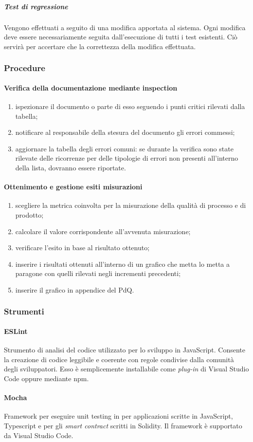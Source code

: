 \subparagraph*{Test di regressione}
Vengono effettuati a seguito di una modifica apportata al sistema. Ogni modifica deve essere necessariamente seguita dall'esecuzione di tutti i test esistenti. Ciò servirà per accertare che la correttezza della modifica effettuata.


\subsubsection{Procedure}
\paragraph{Verifica della documentazione mediante inspection}
\begin{enumerate}
	\item ispezionare il documento o parte di esso seguendo i punti critici rilevati dalla tabella;
	\item notificare al responsabile della stesura del documento gli errori commessi;
	\item aggiornare la tabella degli errori comuni: se durante la verifica sono state rilevate delle ricorrenze per delle tipologie di errori non presenti all'interno della lista, dovranno essere riportate.
\end{enumerate}
\paragraph{Ottenimento e gestione esiti misurazioni}
\begin{enumerate}
	\item scegliere la metrica coinvolta per la misurazione della qualità di processo e di prodotto;
	\item calcolare il valore corrispondente all'avvenuta misurazione;
	\item verificare l'esito in base al risultato ottenuto;
	\item inserire i risultati ottenuti all'interno di un grafico che metta lo metta a paragone con quelli rilevati negli incrementi precedenti;
	\item inserire il grafico in appendice del PdQ.
\end{enumerate}

\subsubsection{Strumenti}
\paragraph{ESLint}
Strumento di analisi del codice utilizzato per lo sviluppo in JavaScript. Consente la creazione di codice leggibile e coerente con regole condivise dalla comunità degli sviluppatori. Esso è semplicemente installabile come \textit{plug-in\glo} di Visual Studio Code oppure mediante npm.

\paragraph{Mocha}
Framework per eseguire unit testing in per applicazioni scritte in JavaScript, Typescript e per gli \textit{smart contract\glo} scritti in Solidity. Il framework è supportato da Visual Studio Code.
